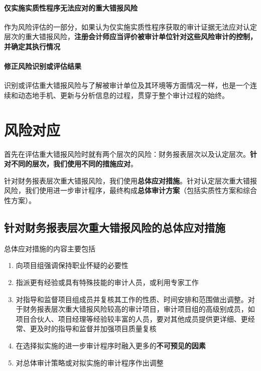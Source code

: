 \documentclass[UTF8,12pt]{ctexart}
\numberwithin{equation}{section} %
\numberwithin{figure}{section}
\numberwithin{table}{section}
\begin{document}
	
	
	\paragraph{仅实施实质性程序无法应对的重大错报风险}
	作为风险评估的一部分，如果认为仅实施实质性程序获取的审计证据无法应对认定层次的重大错报风险，\textbf{注册会计师应当评价被审计单位针对这些风险审计的控制，并确定其执行情况}
	
	\paragraph{修正风险识别或评估结果}
	识别或评估重大错报风险与了解被审计单位及其环境等方面情况一样，也是一个连续和动态地手机、更新与分析信息的过程，贯穿于整个审计过程的始终。
	
	\newpage
	\section{风险对应}
	首先在评估重大错报风险时就有两个层次的风险：财务报表层次以及认定层次。\textbf{针对不同的层次，我们使用不同的措施应对}。
	
	针对财务报表层次重大错报风险，我们使用\textbf{总体应对措施}。针对认定层次重大错报风险，我们使用进一步审计程序，最终构成\textbf{总体审计方案}（包括实质性方案和综合性方案）。
	
	\subsection{针对财务报表层次重大错报风险的总体应对措施}
	总体应对措施的内容主要包括
	\begin{enumerate}
		\item 向项目组强调保持职业怀疑的必要性
		
		\item 指派更有经验或具有特殊技能的审计人员，或利用专家工作
		
		\item 对指导和监督项目组成员并复核其工作的性质、时间安排和范围做出调整。对于财务报表层次重大错报风险较高的审计项目，审计项目组的高级别成员，如项目合伙人、项目经理等经验较丰富的人员，要对其他成员提供更详细、更经常、更及时的指导和监督并加强项目质量复核
		
		\item 在选择拟实施的进一步审计程序时融入更多的\textbf{不可预见的因素}
		
		\item 对总体审计策略或对拟实施的审计程序作出调整
	\end{enumerate}
	
\end{document}
